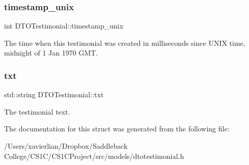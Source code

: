 \subsubsection{\texorpdfstring{timestamp\_unix}{timestamp\_unix}}
{\footnotesize\ttfamily int D\+T\+O\+Testimonial\+::timestamp\+\_\+unix}

The time when this testimonial was created in milliseconds since U\+N\+IX time, midnight of 1 Jan 1970 G\+MT. \mbox{\label{struct_d_t_o_testimonial_a2fe975367ddcb0e51ff4834ecf40a503}} 
\subsubsection{\texorpdfstring{txt}{txt}}
{\footnotesize\ttfamily std\+::string D\+T\+O\+Testimonial\+::txt}

The testimonial text. 

The documentation for this struct was generated from the following file\+:\begin{DoxyCompactItemize}
\item 
/\+Users/xavierlian/\+Dropbox/\+Saddleback College/\+C\+S1\+C/\+C\+S1\+C\+Project/src/models/dtotestimonial.\+h\end{DoxyCompactItemize}

